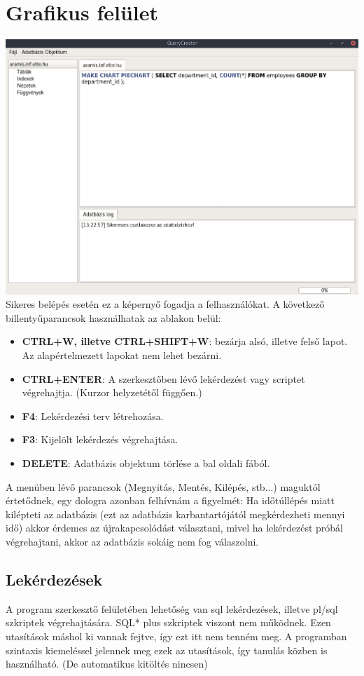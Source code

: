 \documentclass{elteikthesis}
\begin{document}
\section{Grafikus felület}
\includegraphics[width=1.0\textwidth]{gui}
Sikeres belépés esetén ez a képernyő fogadja a felhasználókat.
A következő billentyűparancsok használhatak az ablakon belül:
\begin{itemize}
  \item \textbf{CTRL+W, illetve CTRL+SHIFT+W}: bezárja alsó, illetve felső lapot. Az alapértelmezett lapokat nem lehet bezárni.
  \item \textbf{CTRL+ENTER}: A szerkesztőben lévő lekérdezést vagy scriptet végrehajtja. (Kurzor helyzetétől függően.)
  \item \textbf{F4}: Lekérdezési terv létrehozása.
  \item \textbf{F3}: Kijelölt lekérdezés végrehajtása.
  \item \textbf{DELETE}: Adatbázis objektum törlése a bal oldali fából.
\end{itemize}

A menüben lévő parancsok (Megnyitás, Mentés, Kilépés, stb...) maguktól értetődnek, egy dologra azonban
felhívnám a figyelmét: Ha időtúllépés miatt kilépteti az adatbázis (ezt az adatbázis karbantartójától megkérdezheti mennyi idő) akkor
érdemes az újrakapcsolódást választani, mivel ha lekérdezést próbál végrehajtani, akkor az adatbázis sokáig nem fog válaszolni.

\subsection{Lekérdezések}
A program szerkesztő felületében lehetőség van sql lekérdezések, illetve pl/sql szkriptek végrehajtására. SQL* plus szkriptek viszont
nem működnek. Ezen utasítások máshol ki vannak fejtve, így ezt itt nem tenném meg. A programban szintaxis kiemeléssel jelennek meg ezek
az utasítások, így tanulás közben is használható. (De automatikus kitöltés nincsen)
\end{document}

